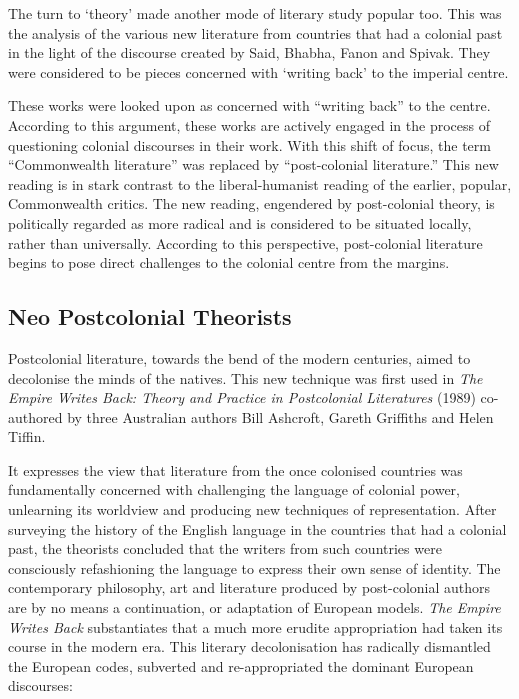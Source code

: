 \begin{description}[leftmargin=0cm,labelindent=0cm]
 The turn to ‘theory’ made another mode of literary study popular too. This was the analysis of the various new literature from countries that had a colonial past in the light of the discourse created by Said, Bhabha, Fanon and Spivak. They were considered to be pieces concerned with ‘writing back’ to the imperial centre. 
 
 These works were looked upon as concerned with ``writing back'' to the centre. According to this argument, these works are actively engaged in the process of questioning colonial discourses in their work. With this shift of focus, the term ``Commonwealth literature'' was replaced by ``post-colonial literature.'' This new reading is in stark contrast to the liberal-humanist reading of the earlier, popular, Commonwealth critics. The new reading, engendered by post-colonial theory, is politically regarded as more radical and is considered to be situated locally, rather than universally. According to this perspective, post-colonial literature begins to pose direct challenges to the colonial centre from the margins.
\end{description}

\subsection{Neo Postcolonial Theorists}

Postcolonial literature, towards the bend of the modern centuries, aimed to decolonise the minds of the natives. This new technique was first used in \emph{The Empire Writes Back: Theory and Practice in Postcolonial Literatures} (1989) co-authored by three Australian authors Bill Ashcroft, Gareth Griffiths and Helen Tiffin. 

It expresses the view that literature from the once colonised countries was fundamentally concerned with challenging the language of colonial power, unlearning its worldview and producing new techniques of representation. After surveying the history of the English language in the countries that had a colonial past, the theorists concluded that the writers from such countries were consciously refashioning the language to express their own sense of identity. The contemporary philosophy, art and literature produced by post-colonial authors are by no means a continuation, or adaptation of European models. \emph{The Empire Writes Back} substantiates that a much more erudite appropriation had taken its course in the modern era. This literary decolonisation has radically dismantled the European codes, subverted and re-appropriated the dominant European discourses: 

